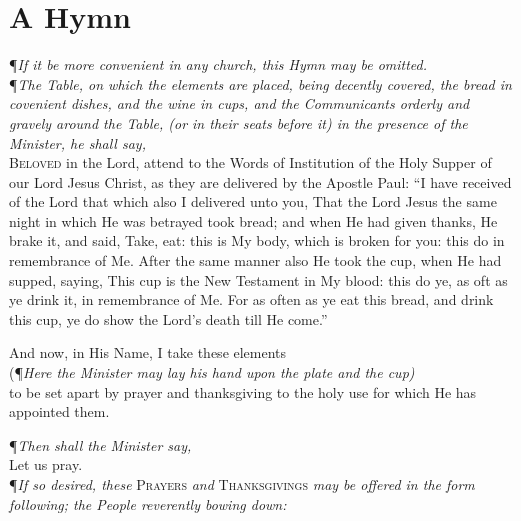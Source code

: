 \section*{A Hymn}

\P\textit{If it be more convenient in any church, this Hymn may be omitted.} \\

\noindent\P\textit{The Table, on which the elements are placed, being decently covered, the bread in covenient dishes, and the wine in cups, and the Communicants orderly and gravely around the Table, (or in their seats before it) in the presence of the Minister, he shall say,} \\ 

\lettrine{B}{eloved} in the Lord, attend to the Words of Institution of the Holy Supper of our Lord Jesus Christ, as they are delivered by the Apostle Paul:
``I have received of the Lord that which also I delivered unto you,
That the Lord Jesus the same night in which He was betrayed took bread; and when He had given thanks, He brake it, and said, Take, eat: this is My body, which is broken for you: this do in remembrance of Me.
After the same manner also He took the cup, when He had supped, saying, This cup is the New Testament in My blood: this do ye, as oft as ye drink it, in remembrance of Me.
For as often as ye eat this bread, and drink this cup, ye do show the Lord's death till He come.''

And now, in His Name, I take these elements \\

\noindent (\P\textit{Here the Minister may lay his hand upon the plate and the cup)} \\

\noindent to be set apart by prayer and thanksgiving to the holy use for which He has appointed them. \\

\begin{center}
\P\textit{Then shall the Minister say,} \\
\vspace{1ex}
Let us pray. \\
\vspace{1ex}
\P\textit{If so desired, these} \textsc{Prayers} \textit{and} \textsc{Thanksgivings} \textit{may be offered in the form following; the People reverently bowing down:}    
\end{center}

